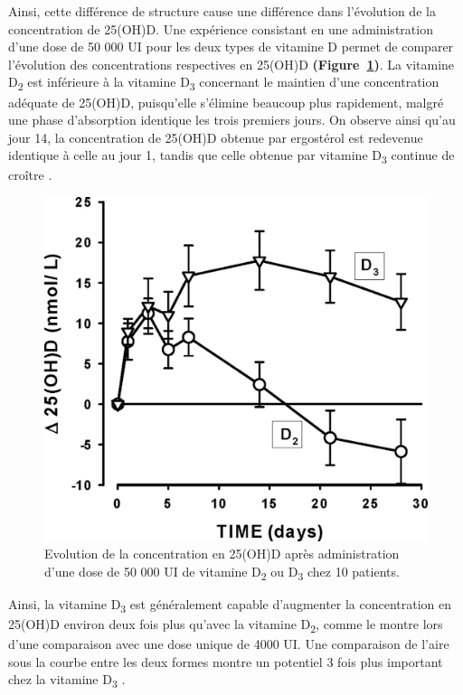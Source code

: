 \documentclass[
  a4paper,
  DIV=11,
  numbers=noendperiod,
  listof=totoc]{scrreprt}
\begin{document}
Ainsi, cette différence de structure cause une différence dans
l'évolution de la concentration de 25(OH)D. Une expérience consistant en
une administration d'une dose de 50 000 UI pour les deux types de
vitamine D permet de comparer l'évolution des concentrations respectives
en 25(OH)D \textbf{(Figure~\ref{fig-PK-VD})}. La vitamine
D\textsubscript{2} est inférieure à la vitamine D\textsubscript{3}
concernant le maintien d'une concentration adéquate de 25(OH)D,
puisqu'elle s'élimine beaucoup plus rapidement, malgré une phase
d'absorption identique les trois premiers jours. On observe ainsi qu'au
jour 14, la concentration de 25(OH)D obtenue par ergostérol est
redevenue identique à celle au jour 1, tandis que celle obtenue par
vitamine D\textsubscript{3} continue de croître \autocite{Armas.2004}.

\begin{figure}

{\centering \includegraphics[width=4.64583in,height=\textheight]{figures/PK_D2_vs_D3.jpeg}

}

\caption{\label{fig-PK-VD}Evolution de la concentration en 25(OH)D après
administration d'une dose de 50 000 UI de vitamine D\textsubscript{2} ou
D\textsubscript{3} chez 10 patients. \textcite{Armas.2004}}

\end{figure}

Ainsi, la vitamine D\textsubscript{3} est généralement capable
d'augmenter la concentration en 25(OH)D environ deux fois plus qu'avec
la vitamine D\textsubscript{2}, comme le montre \textcite{Trang.1998}
lors d'une comparaison avec une dose unique de 4000 UI. Une comparaison
de l'aire sous la courbe entre les deux formes montre un potentiel 3
fois plus important chez la vitamine D\textsubscript{3}
\autocite{Armas.2004}.
\end{document}
